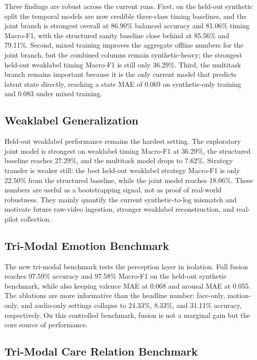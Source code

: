 Three findings are robust across the current runs. First, on the held-out synthetic split the temporal models are now credible three-class timing baselines, and the joint branch is strongest overall at 86.90\% balanced accuracy and 81.06\% timing Macro-F1, with the structured sanity baseline close behind at 85.56\% and 79.11\%. Second, mixed training improves the aggregate offline numbers for the joint branch, but the combined columns remain synthetic-heavy; the strongest held-out weaklabel timing Macro-F1 is still only 36.29\%. Third, the multitask branch remains important because it is the only current model that predicts latent state directly, reaching a state MAE of 0.069 on synthetic-only training and 0.083 under mixed training.

\subsection{Weaklabel Generalization}


Held-out weaklabel performance remains the hardest setting. The exploratory joint model is strongest on weaklabel timing Macro-F1 at 36.29\%, the structured baseline reaches 27.29\%, and the multitask model drops to 7.62\%. Strategy transfer is weaker still: the best held-out weaklabel strategy Macro-F1 is only 22.50\% from the structured baseline, while the joint model reaches 18.06\%. These numbers are useful as a bootstrapping signal, not as proof of real-world robustness. They mainly quantify the current synthetic-to-log mismatch and motivate future raw-video ingestion, stronger weaklabel reconstruction, and real-pilot collection.

\subsection{Tri-Modal Emotion Benchmark}


The new tri-modal benchmark tests the perception layer in isolation. Full fusion reaches 97.59\% accuracy and 97.58\% Macro-F1 on the held-out synthetic benchmark, while also keeping valence MAE at 0.068 and arousal MAE at 0.055. The ablations are more informative than the headline number: face-only, motion-only, and audio-only settings collapse to 24.33\%, 8.33\%, and 31.11\% accuracy, respectively. On this controlled benchmark, fusion is not a marginal gain but the core source of performance.

\subsection{Tri-Modal Care Relation Benchmark}


